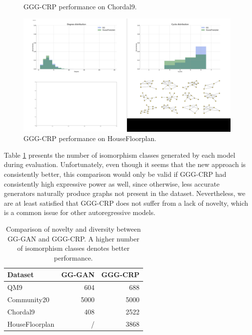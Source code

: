 \begin{figure}
\begin{minipage}{0.475\textwidth}
    \caption{GGG-CRP performance on Chordal9.}
    \label{fig:chordal9}    
    \end{minipage}
    \hfill
    \begin{minipage}{0.475\textwidth}
    \centering
    \includegraphics[width=\textwidth]{figures/gggcrp/Housefloorplan.pdf}
    \caption{GGG-CRP performance on HouseFloorplan.}
    \label{fig:house}    
    \end{minipage}
\end{figure}


Table \ref{tab:novelty} presents the number of isomorphism classes generated by each model during evaluation. Unfortunately, even though it seems that the new approach is consistently better, this comparison would only be valid if GGG-CRP had consistently high expressive power as well, since otherwise, less accurate generators naturally produce graphs not present in the dataset. Nevertheless, we are at least satisfied that GGG-CRP does not suffer from a lack of novelty, which is a common issue for other autoregressive models.

\begin{table}[H]
\centering
\caption[Comparison of novelty and diversity between GG-GAN and GGG-CRP.]{Comparison of novelty and diversity between GG-GAN and GGG-CRP. A higher number of isomorphism classes denotes better performance.}
\label{tab:novelty}
\begin{tabular}{lrr}
\toprule
Dataset & GG-GAN & GGG-CRP \\
\midrule
QM9 & 604 & 688 \\
Community20 & 5000 & 5000 \\
Chordal9 & 408 & 2522 \\
HouseFloorplan & / & 3868 \\
\bottomrule
\end{tabular}
\end{table}


